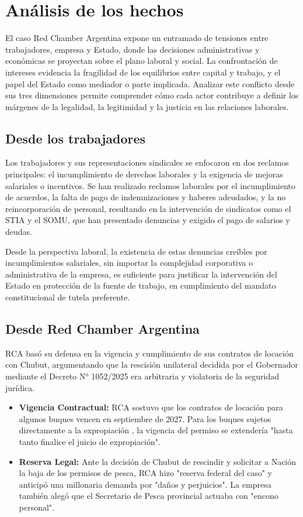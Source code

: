 \documentclass[]{informeutn}
\begin{document}
  \chapter{Análisis de los hechos}
    El caso Red Chamber Argentina expone un entramado de tensiones entre trabajadores, empresa y Estado, donde las
    decisiones administrativas y económicas se proyectan sobre el plano laboral y social. La confrontación de intereses
    evidencia la fragilidad de los equilibrios entre capital y trabajo, y el papel del Estado como mediador o parte
    implicada. Analizar este conflicto desde sus tres dimensiones permite comprender cómo cada actor contribuye a
    definir los márgenes de la legalidad, la legitimidad y la justicia en las relaciones laborales.

    \section{Desde los trabajadores}
      Los trabajadores y sus representaciones sindicales se enfocaron en dos reclamos principales: el incumplimiento de
      derechos laborales y la exigencia de mejoras salariales o incentivos. Se han realizado reclamos laborales por el
      incumplimiento de acuerdos, la falta de pago de indemnizaciones y haberes adeudados, y la no reincorporación de
      personal, resultando en la intervención de sindicatos como el STIA y el SOMU, que han presentado denuncias y
      exigido el pago de salarios y deudas.

      Desde la perspectiva laboral, la existencia de estas denuncias creíbles por incumplimientos salariales, sin
      importar la complejidad corporativa o administrativa de la empresa, es suficiente para justificar la intervención
      del Estado en protección de la fuente de trabajo, en cumplimiento del mandato constitucional de tutela preferente.

    \section{Desde Red Chamber Argentina}
      RCA basó su defensa en la vigencia y cumplimiento de sus contratos de locación con Chubut, argumentando que la
      rescisión unilateral decidida por el Gobernador mediante el Decreto N° 1052/2025 era arbitraria y violatoria de la
      seguridad jurídica.
      \begin{itemize}
        \item \textbf{Vigencia Contractual:} RCA sostuvo que los contratos de locación para algunos buques  vencen en
          septiembre de 2027. Para los buques sujetos directamente a la expropiación , la vigencia del permiso se
          extendería "hasta tanto finalice el juicio de expropiación".
        \item \textbf{Reserva Legal:} Ante la decisión de Chubut de rescindir y solicitar a Nación la baja de los
          permisos de pesca, RCA hizo "reserva federal del caso" y anticipó una millonaria demanda por "daños y
          perjuicios". La empresa también alegó que el Secretario de Pesca provincial actuaba con "encono personal".
      \end{itemize}
\end{document}
